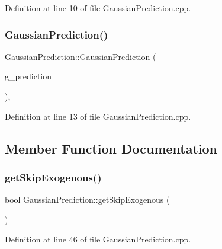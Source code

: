Definition at line 10 of file Gaussian\+Prediction.\+cpp.

\mbox{\label{classbfl_1_1GaussianPrediction_a8673dfd2a3fbbf84ec99db86f28860e6}} 
\subsubsection{\texorpdfstring{Gaussian\+Prediction()}{GaussianPrediction()}\hspace{0.1cm}{\footnotesize\ttfamily [2/2]}}
{\footnotesize\ttfamily Gaussian\+Prediction\+::\+Gaussian\+Prediction (\begin{DoxyParamCaption}\item[{\mbox{\hyperlink{classbfl_1_1GaussianPrediction}{Gaussian\+Prediction}} \&\&}]{g\+\_\+prediction }\end{DoxyParamCaption})\hspace{0.3cm}{\ttfamily [protected]}, {\ttfamily [noexcept]}}



Definition at line 13 of file Gaussian\+Prediction.\+cpp.



\subsection{Member Function Documentation}
\mbox{\label{classbfl_1_1GaussianPrediction_aaf3743111a493b90092b7ead9cbf7825}} 
\subsubsection{\texorpdfstring{get\+Skip\+Exogenous()}{getSkipExogenous()}}
{\footnotesize\ttfamily bool Gaussian\+Prediction\+::get\+Skip\+Exogenous (\begin{DoxyParamCaption}{ }\end{DoxyParamCaption})}



Definition at line 46 of file Gaussian\+Prediction.\+cpp.

